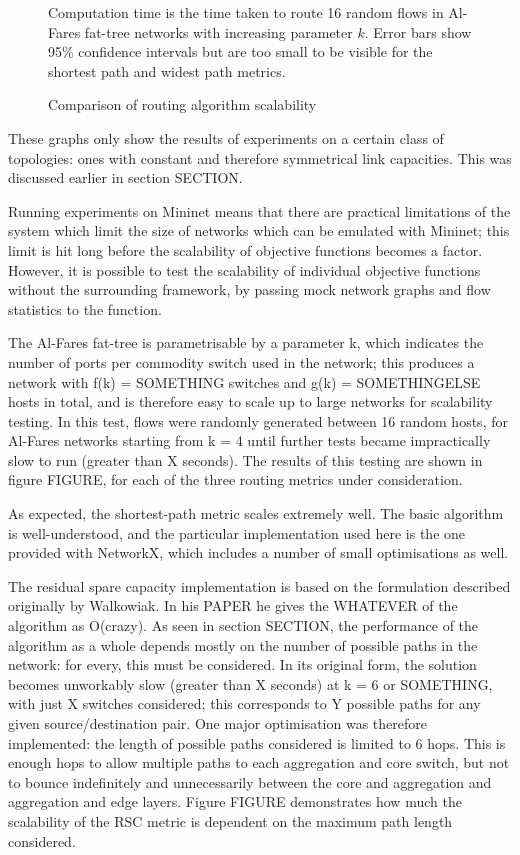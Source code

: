 \begin{figure}
\centering

\caption{Comparison of routing algorithm scalability}
\label{fig:sca1}
Computation time is the time taken to route 16 random flows in Al-Fares fat-tree networks with increasing parameter $k$. Error bars show 95\% confidence intervals but are too small to be visible for the shortest path and widest path metrics. 
\end{figure}

\cite{fake}

These graphs only show the results of experiments on a certain class of topologies: ones with constant and therefore symmetrical link capacities. This was discussed earlier in section SECTION.


Running experiments on Mininet means that there are practical limitations of the system which limit the size of networks which can be emulated with Mininet; this limit is hit long before the scalability of objective functions becomes a factor. However, it is possible to test the scalability of individual objective functions without the surrounding framework, by passing mock network graphs and flow statistics to the function. 

The Al-Fares fat-tree is parametrisable by a parameter k, which indicates the number of ports per commodity switch used in the network; this produces a network with f(k) = SOMETHING switches and g(k) = SOMETHINGELSE hosts in total, and is therefore easy to scale up to large networks for scalability testing. In this test, flows were randomly generated between 16 random hosts, for Al-Fares networks starting from k = 4 until further tests became impractically slow to run (greater than X seconds).  The results of this testing are shown in figure FIGURE, for each of the three routing metrics under consideration.

As expected, the shortest-path metric scales extremely well. The basic algorithm is well-understood, and the particular implementation used here is the one provided with NetworkX, which includes a number of small optimisations as well.

The residual spare capacity implementation is based on the formulation described originally by Walkowiak. In his PAPER he gives the WHATEVER of the algorithm as O(crazy). As seen in section SECTION, the performance of the algorithm as a whole depends mostly on the number of possible paths in the network: for every, this must be considered. In its original form, the solution becomes unworkably slow (greater than X seconds) at k = 6 or SOMETHING, with just X switches considered; this corresponds to Y possible paths for any given source/destination pair. One major optimisation was therefore implemented: the length of possible paths considered is limited to 6 hops. This is enough hops to allow multiple paths to each aggregation and core switch, but not to bounce indefinitely and unnecessarily between the core and aggregation and aggregation and edge layers. Figure FIGURE demonstrates how much the scalability of the RSC metric is dependent on the maximum path length considered.

